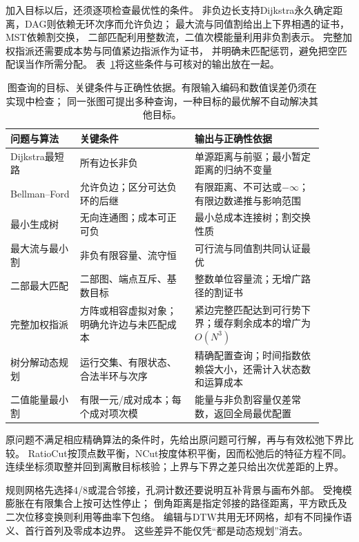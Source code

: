 加入目标以后，还须逐项检查最优性的条件。
非负边长支持Dijkstra永久确定距离，DAG则依赖无环次序而允许负边；
最大流与同值割给出上下界相遇的证书，MST依赖割交换，
二部匹配利用整数流，二值次模能量利用非负割表示。
完整加权指派还需要成本势与同值紧边指派作为证书，
并明确未匹配惩罚，避免把空匹配误当作所需分配。
表~\ref{tab:graph-algorithm-conditions}将这些条件与可核对的输出放在一起。

\begin{table}[htbp]
  \centering
  \caption{图查询的目标、关键条件与正确性依据。有限输入编码和数值误差仍须在实现中检查；
  同一张图可提出多种查询，一种目标的最优解不自动解决其他目标。}
  \label{tab:graph-algorithm-conditions}
  \begin{tabular}{p{0.20\linewidth}p{0.33\linewidth}p{0.37\linewidth}}
    \toprule
    问题与算法 & 关键条件 & 输出与正确性依据\\
    \midrule
    Dijkstra最短路 & 所有边长非负 & 单源距离与前驱；最小暂定距离的归纳不变量\\
    Bellman--Ford & 允许负边；区分可达负环的后继 & 有限距离、不可达或\(-\infty\)；
      有限边数递推与影响范围\\
    最小生成树 & 无向连通图；成本可正可负 & 最小总成本连接树；割交换性质\\
    最大流与最小割 & 非负有限容量、流守恒 & 可行流与同值割共同认证最优\\
    二部最大匹配 & 二部图、端点互斥、基数目标 & 整数单位容量流；无增广路径的割证书\\
    完整加权指派 & 方阵或相容虚拟对象；明确允许边与未匹配成本 &
      紧边完整匹配达到可行势下界；缓存剩余成本的增广为$O(N^3)$\\
    树分解动态规划 & 运行交集、有限状态、合法半环与次序 &
      精确配置查询；时间指数依赖袋大小，还需计入状态数和运算成本\\
    二值能量最小割 & 有限一元/成对成本；每个成对项次模 &
      能量与非负割容量仅差常数，返回全局最优配置\\
    \bottomrule
  \end{tabular}
\end{table}

原问题不满足相应精确算法的条件时，先给出原问题可行解，再与有效松弛下界比较。
RatioCut按顶点数平衡，NCut按度体积平衡，因而松弛后的特征方程不同。
连续坐标须取整并回到离散目标核验；上界与下界之差只给出次优差距的上界。

规则网格先选择4/8或混合邻接，孔洞计数还要说明互补背景与画布外部。
受掩模膨胀在有限集合上按可达性停止；
倒角距离是指定邻接的路径距离，平方欧氏及二次位移变换则利用等曲率下包络。
编辑与DTW共用无环网格，却有不同操作语义、首行首列及零成本边界。
这些差异不能仅凭“都是动态规划”消去。

